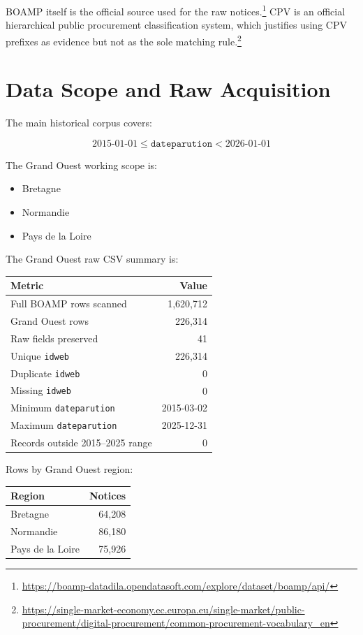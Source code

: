 \documentclass[11pt,a4paper]{article}
\newcommand{\code}[1]{\texttt{#1}}
\begin{document}
BOAMP itself is the official source used for the raw notices.\footnote{\url{https://boamp-datadila.opendatasoft.com/explore/dataset/boamp/api/}} CPV is an official hierarchical public procurement classification system, which justifies using CPV prefixes as evidence but not as the sole matching rule.\footnote{\url{https://single-market-economy.ec.europa.eu/single-market/public-procurement/digital-procurement/common-procurement-vocabulary_en}}

\section*{Data Scope and Raw Acquisition}

The main historical corpus covers:

\[
2015\text{-}01\text{-}01 \leq \texttt{dateparution} < 2026\text{-}01\text{-}01
\]

The Grand Ouest working scope is:

\begin{itemize}
  \item Bretagne
  \item Normandie
  \item Pays de la Loire
\end{itemize}

The Grand Ouest raw CSV summary is:

\begin{center}
\begin{tabular}{lr}
\toprule
Metric & Value \\
\midrule
Full BOAMP rows scanned & 1,620,712 \\
Grand Ouest rows & 226,314 \\
Raw fields preserved & 41 \\
Unique \code{idweb} & 226,314 \\
Duplicate \code{idweb} & 0 \\
Missing \code{idweb} & 0 \\
Minimum \code{dateparution} & 2015-03-02 \\
Maximum \code{dateparution} & 2025-12-31 \\
Records outside 2015--2025 range & 0 \\
\bottomrule
\end{tabular}
\end{center}

Rows by Grand Ouest region:

\begin{center}
\begin{tabular}{lr}
\toprule
Region & Notices \\
\midrule
Bretagne & 64,208 \\
Normandie & 86,180 \\
Pays de la Loire & 75,926 \\
\bottomrule
\end{tabular}
\end{center}
\end{document}
